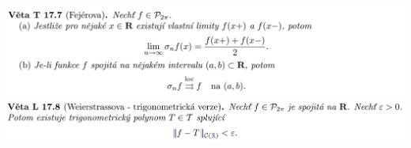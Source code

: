 \documentclass[12pt,a4paper]{article}
\begin{document}
\begin{center}
		\includegraphics[width=\textwidth]{img/4four/2020-06-21 11 49 36.png}\vspace{0.3cm}
		\includegraphics[width=\textwidth]{img/4four/2020-06-21 13 21 23.png}\vspace{0.3cm}
	\end{center}
	
\end{document}
